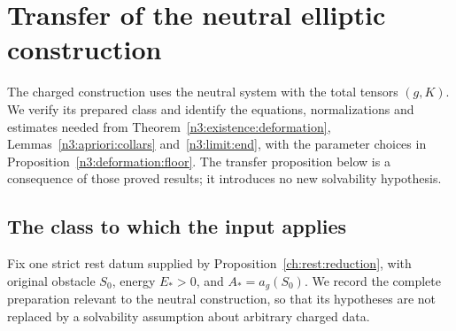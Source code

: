 \section{Transfer of the neutral elliptic construction}
\label{ch:ell:section}

The charged construction uses the neutral system with the total tensors
$(g,K)$. We verify its prepared class and identify the equations,
normalizations and estimates needed from
Theorem~\ref{n3:existence:deformation}, Lemmas~\ref{n3:apriori:collars}
and~\ref{n3:limit:end}, with the parameter choices in
Proposition~\ref{n3:deformation:floor}. The transfer proposition below is a
consequence of those proved results; it introduces no new solvability
hypothesis.

\subsection{The class to which the input applies}

Fix one strict rest datum supplied by Proposition~\ref{ch:rest:reduction},
with original obstacle $S_0$, energy $E_*>0$, and
$A_*=a_g(S_0)$.  We record the complete preparation relevant to the
neutral construction, so that its hypotheses are not replaced by a solvability
assumption about arbitrary charged data.

